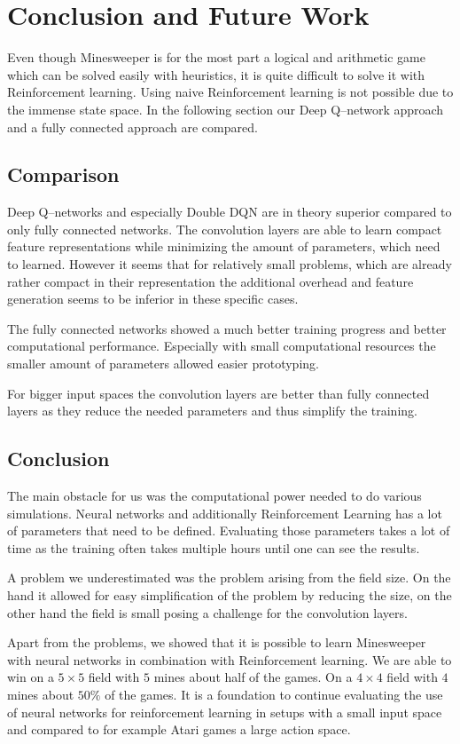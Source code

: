 \chapter{Conclusion and Future Work}

Even though Minesweeper is for the most part a logical and arithmetic game which can be solved easily with heuristics, it is quite difficult to solve it with Reinforcement learning.
Using naive Reinforcement learning is not possible due to the immense state space.
In the following section our Deep Q--network approach and a fully connected approach are compared.

\section{Comparison}
Deep Q--networks and especially Double DQN are in theory superior compared to only fully connected networks.
The convolution layers are able to learn compact feature representations while minimizing the amount of parameters, which need to learned.
However it seems that for relatively small problems, which are already rather compact in their representation the additional overhead and feature generation seems to be inferior in these specific cases.

The fully connected networks showed a much better training progress and better computational performance.
Especially with small computational resources the smaller amount of parameters allowed easier prototyping.

For bigger input spaces the convolution layers are better than fully connected layers as they reduce the needed parameters and thus simplify the training.
\section{Conclusion}
The main obstacle for us was the computational power needed to do various simulations.
Neural networks and additionally Reinforcement Learning has a lot of parameters that need to be defined.
Evaluating those parameters takes a lot of time as the training often takes multiple hours until one can see the results.

A problem we underestimated was the problem arising from the field size.
On the hand it allowed for easy simplification of the problem by reducing the size, on the other hand the field is small posing a challenge for the convolution layers.

Apart from the problems, we showed that it is possible to learn Minesweeper with neural networks in combination with Reinforcement learning.
We are able to win on a $5 \times 5$ field with $5$ mines about half of the games.
On a $4 \times 4$ field with $4$ mines about $50\%$ of the games.
It is a foundation to continue evaluating the use of neural networks for reinforcement learning in setups with a small input space and compared to for example Atari games a large action space.

